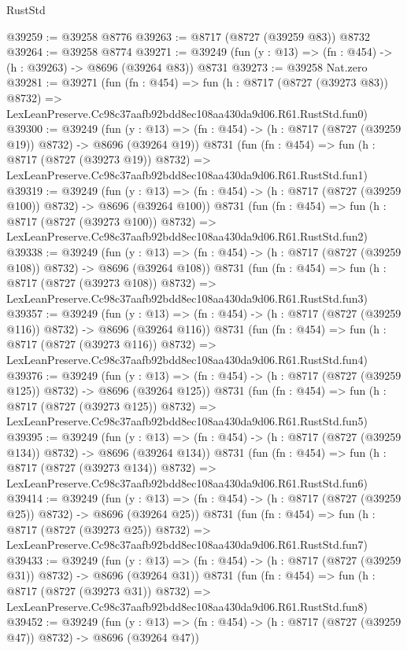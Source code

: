 \begin{lexlean}{RustStd}
\begin{coremodule}
@39259 := @39258 @8776
@39263 := @8717 (@8727 (@39259 @83)) @8732
@39264 := @39258 @8774
@39271 := @39249 (fun (y : @13) => (fn : @454) -> (h : @39263) -> @8696 (@39264 @83)) @8731
@39273 := @39258 Nat.zero
@39281 := @39271
    (fun (fn : @454) =>
    fun (h : @8717 (@8727 (@39273 @83)) @8732) =>
    LexLeanPreserve.Cc98c37aafb92bdd8ec108aa430da9d06.R61.RustStd.fun0)
@39300 := @39249
    (fun (y : @13) => (fn : @454) -> (h : @8717 (@8727 (@39259 @19)) @8732) -> @8696 (@39264 @19))
    @8731
    (fun (fn : @454) =>
    fun (h : @8717 (@8727 (@39273 @19)) @8732) =>
    LexLeanPreserve.Cc98c37aafb92bdd8ec108aa430da9d06.R61.RustStd.fun1)
@39319 := @39249
    (fun (y : @13) => (fn : @454) -> (h : @8717 (@8727 (@39259 @100)) @8732) -> @8696 (@39264 @100))
    @8731
    (fun (fn : @454) =>
    fun (h : @8717 (@8727 (@39273 @100)) @8732) =>
    LexLeanPreserve.Cc98c37aafb92bdd8ec108aa430da9d06.R61.RustStd.fun2)
@39338 := @39249
    (fun (y : @13) => (fn : @454) -> (h : @8717 (@8727 (@39259 @108)) @8732) -> @8696 (@39264 @108))
    @8731
    (fun (fn : @454) =>
    fun (h : @8717 (@8727 (@39273 @108)) @8732) =>
    LexLeanPreserve.Cc98c37aafb92bdd8ec108aa430da9d06.R61.RustStd.fun3)
@39357 := @39249
    (fun (y : @13) => (fn : @454) -> (h : @8717 (@8727 (@39259 @116)) @8732) -> @8696 (@39264 @116))
    @8731
    (fun (fn : @454) =>
    fun (h : @8717 (@8727 (@39273 @116)) @8732) =>
    LexLeanPreserve.Cc98c37aafb92bdd8ec108aa430da9d06.R61.RustStd.fun4)
@39376 := @39249
    (fun (y : @13) => (fn : @454) -> (h : @8717 (@8727 (@39259 @125)) @8732) -> @8696 (@39264 @125))
    @8731
    (fun (fn : @454) =>
    fun (h : @8717 (@8727 (@39273 @125)) @8732) =>
    LexLeanPreserve.Cc98c37aafb92bdd8ec108aa430da9d06.R61.RustStd.fun5)
@39395 := @39249
    (fun (y : @13) => (fn : @454) -> (h : @8717 (@8727 (@39259 @134)) @8732) -> @8696 (@39264 @134))
    @8731
    (fun (fn : @454) =>
    fun (h : @8717 (@8727 (@39273 @134)) @8732) =>
    LexLeanPreserve.Cc98c37aafb92bdd8ec108aa430da9d06.R61.RustStd.fun6)
@39414 := @39249
    (fun (y : @13) => (fn : @454) -> (h : @8717 (@8727 (@39259 @25)) @8732) -> @8696 (@39264 @25))
    @8731
    (fun (fn : @454) =>
    fun (h : @8717 (@8727 (@39273 @25)) @8732) =>
    LexLeanPreserve.Cc98c37aafb92bdd8ec108aa430da9d06.R61.RustStd.fun7)
@39433 := @39249
    (fun (y : @13) => (fn : @454) -> (h : @8717 (@8727 (@39259 @31)) @8732) -> @8696 (@39264 @31))
    @8731
    (fun (fn : @454) =>
    fun (h : @8717 (@8727 (@39273 @31)) @8732) =>
    LexLeanPreserve.Cc98c37aafb92bdd8ec108aa430da9d06.R61.RustStd.fun8)
@39452 := @39249
    (fun (y : @13) => (fn : @454) -> (h : @8717 (@8727 (@39259 @47)) @8732) -> @8696 (@39264 @47))

\end{coremodule}
\end{lexlean}
